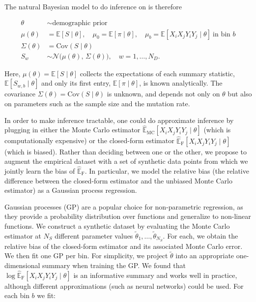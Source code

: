 \documentclass[12pt]{article}
\begin{document}
The natural Bayesian model to do inference on is therefore

\begin{equation}
	\begin{aligned}
		\theta         & \sim \text{demographic prior}                              \\
		\mu(\theta)    & = \mathbb{E}[S \mid \theta], \quad
		\mu_0 = \mathbb{E}[\pi \mid \theta], \quad
		\mu_b = \mathbb{E}[X_iX_jY_iY_j \mid \theta] \ \text{in bin } b             \\
		\Sigma(\theta) & = \mathrm{Cov}(S \mid \theta)                              \\
		S_w            & \sim \mathcal{N}\!\big(\mu(\theta),\, \Sigma(\theta)\big),
		\quad w = 1, \dots, N_D.
	\end{aligned}
	\label{eq:natural_model}
\end{equation}

Here, $\mu(\theta) = \mathbb{E}[S \mid \theta]$ collects the expectations of each summary statistic, $\mathbb{E}[S_{w,b} \mid \theta]$ and only its first entry, $\mathbb{E}[\pi \mid \theta]$, is known analytically. The covariance $\Sigma(\theta) = \mathrm{Cov}(S \mid \theta)$ is unknown, and depends not only on $\theta$ but also on parameters such as the sample size and the mutation rate.

In order to make inference tractable, one could do approximate inference by plugging in either the Monte Carlo estimator $\widehat{\mathbb{E}}_{\mathrm{MC}}[X_iX_jY_iY_j \mid \theta]$ (which is computationally expensive) or the closed-form estimator $\widehat{\mathbb{E}}_{\mathrm{F}}[X_iX_jY_iY_j \mid \theta]$ (which is biased). Rather than deciding between one or the other, we propose to augment the empirical dataset with a set of synthetic data points from which we jointly learn the bias of $\widehat{\mathbb{E}}_{\mathrm{F}}$. In particular, we model the relative bias (the relative difference between the closed-form estimator and the unbiased Monte Carlo estimator) as a Gaussian process regression.

Gaussian processes (GP) are a popular choice for non-parametric regression, as they provide a probability distribution over functions and generalize to non-linear functions. We construct a synthetic dataset by evaluating the Monte Carlo estimator at $N_S$ different parameter values $\tilde\theta_1, \dots, \tilde\theta_{N_S}$. For each, we obtain the relative bias of the closed-form estimator and its associated Monte Carlo error. We then fit one GP per bin. For simplicity, we project $\tilde\theta$ into an appropriate one-dimensional summary when training the GP. We found that $\log\widehat{\mathbb{E}}_{\mathrm{F}}[X_iX_jY_iY_j \mid \theta]$ is an informative summary and works well in practice, although different approximations (such as neural networks) could be used. For each bin $b$ we fit:
\end{document}
